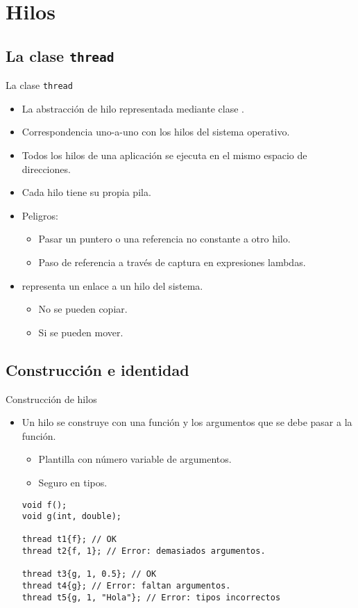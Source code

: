 \section{Hilos}

\subsection{La clase \texttt{thread}}

\begin{frame}{La clase \texttt{thread}}
\begin{itemize}
  \item La abstracción de hilo representada mediante clase .
  \item Correspondencia uno-a-uno con los hilos del sistema operativo.
  \item Todos los hilos de una aplicación se ejecuta en el mismo espacio de direcciones.
  \item Cada hilo tiene su propia pila.
  \item Peligros:
    \begin{itemize}
      \item Pasar un puntero o una referencia no constante a otro hilo.
      \item Paso de referencia a través de captura en expresiones lambdas.
    \end{itemize}
  \item {} representa un enlace a un hilo del sistema.
    \begin{itemize}
      \item No se pueden copiar.
      \item Si se pueden mover.
    \end{itemize}
\end{itemize}
\end{frame}

\subsection{Construcción e identidad}

\begin{frame}[fragile]{Construcción de hilos}
\begin{itemize}
  \item Un hilo se construye con una función y los argumentos que se debe pasar a la función.
    \begin{itemize}
      \item Plantilla con número variable de argumentos.
      \item Seguro en tipos.
    \end{itemize}
\begin{lstlisting}
void f();
void g(int, double);

thread t1{f}; // OK
thread t2{f, 1}; // Error: demasiados argumentos.

thread t3{g, 1, 0.5}; // OK
thread t4{g}; // Error: faltan argumentos.
thread t5{g, 1, "Hola"}; // Error: tipos incorrectos
\end{lstlisting}
\end{itemize}
\end{frame}

